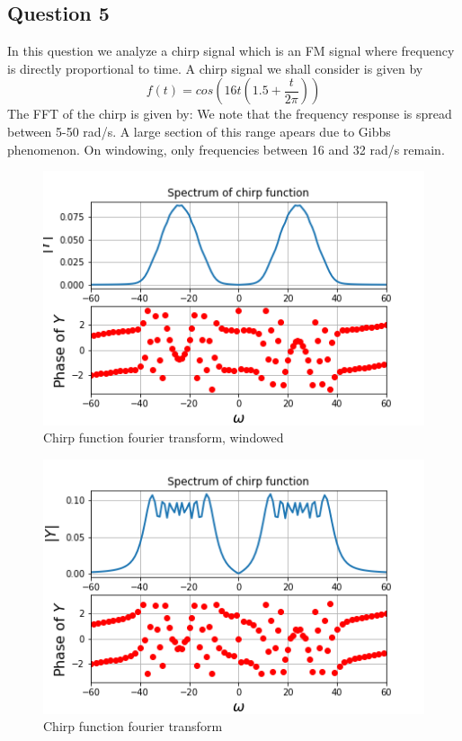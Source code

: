 \documentclass[11pt, a4paper]{article}
\begin{document}
\newpage
\subsection{Question 5}
In this question we analyze a chirp signal which is an FM signal where frequency is directly proportional to time.
A chirp signal we shall consider is given by 
\begin{equation}
    f(t) = cos(16t(1.5 + \frac{t}{2\pi}))
\end{equation}
The FFT of the chirp is given by:
We note that the frequency response is spread between 5-50 rad/s. A large section of this range apears due to Gibbs phenomenon. On windowing, only frequencies between 16 and 32 rad/s remain.
\begin{figure}[h!]
\centering
\includegraphics[scale=0.7]{fig5.png}
\caption{Chirp function fourier transform, windowed}
\label{fig:universe}
\end{figure}
\begin{figure}[h!]
\centering
\includegraphics[scale=0.7]{fig6.png}
\caption{Chirp function fourier transform}
\label{fig:universe}
\end{figure}
\newpage
\end{document}
